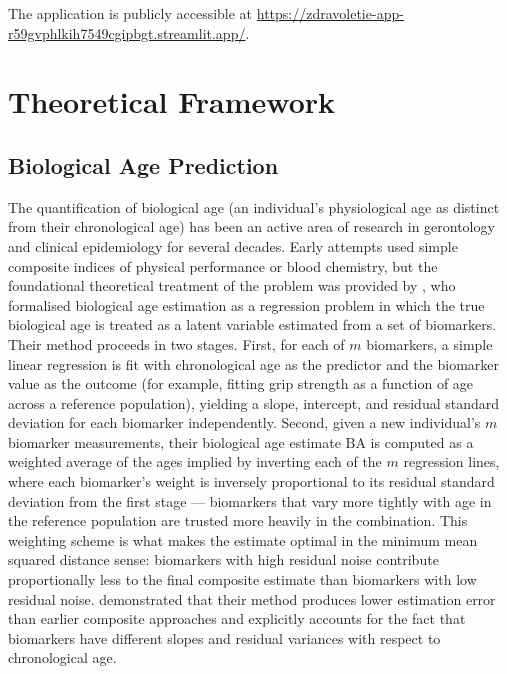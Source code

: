 \documentclass[11pt,a4paper]{report}
\begin{document}
The application is publicly accessible at
\url{https://zdravoletie-app-r59gvphlkih7549cgipbgt.streamlit.app/}.


\chapter{Theoretical Framework}
\label{chap:related}

\section{Biological Age Prediction}

The quantification of biological age (an individual's physiological age as distinct from their
chronological age) has been an active area of research in gerontology and clinical epidemiology
for several decades. Early attempts used simple composite indices of physical performance or blood
chemistry, but the foundational theoretical treatment of the problem was provided by
\citet{Klemera2006}, who formalised biological age estimation as a regression problem in which the
true biological age is treated as a latent variable estimated from a set of biomarkers. Their method
proceeds in two stages. First, for each of $m$ biomarkers, a simple linear regression is fit with
chronological age as the predictor and the biomarker value as the outcome (for example, fitting grip
strength as a function of age across a reference population), yielding a slope, intercept, and
residual standard deviation for each biomarker independently. Second, given a new individual's $m$
biomarker measurements, their biological age estimate $\text{BA}$ is computed as a weighted average
of the ages implied by inverting each of the $m$ regression lines, where each biomarker's weight is
inversely proportional to its residual standard deviation from the first stage --- biomarkers that
vary more tightly with age in the reference population are trusted more heavily in the combination.
This weighting scheme is what makes the estimate optimal in the minimum mean squared distance sense:
biomarkers with high residual noise contribute proportionally less to the final composite estimate
than biomarkers with low residual noise. \citet{Klemera2006} demonstrated that their method produces lower
estimation error than earlier composite approaches and explicitly accounts for the fact that
biomarkers have different slopes and residual variances with respect to chronological age.
\end{document}
